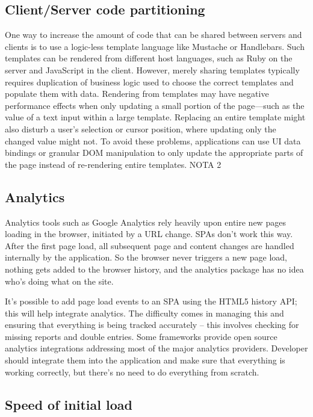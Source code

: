 \subsection{Client/Server code partitioning}
\label{subsec:arc_over_code}
One way to increase the amount of code that can be shared between servers and clients is to use a logic-less template language like Mustache or Handlebars. Such templates can be rendered from different host languages, such as Ruby on the server and JavaScript in the client. However, merely sharing templates typically requires duplication of business logic used to choose the correct templates and populate them with data. Rendering from templates may have negative performance effects when only updating a small portion of the page—such as the value of a text input within a large template. Replacing an entire template might also disturb a user's selection or cursor position, where updating only the changed value might not. To avoid these problems, applications can use UI data bindings or granular DOM manipulation to only update the appropriate parts of the page instead of re-rendering entire templates. NOTA 2

\subsection{Analytics}
\label{subsec:arc_over_analytics}
Analytics tools such as Google Analytics rely heavily upon entire new pages loading in the browser, initiated by a URL change. SPAs don’t work this way.
After the first page load, all subsequent page and content changes are handled internally by the application. So the browser never triggers a new page load, nothing gets added to the browser history, and the analytics package has no idea who’s doing what on the site.

It's possible to add page load events to an SPA using the HTML5 history API; this will help integrate analytics. The difficulty comes in managing this and ensuring that everything is being tracked accurately – this involves checking for missing reports and double entries. Some frameworks provide open source analytics integrations addressing most of the major analytics providers. Developer should integrate them into the application and make sure that everything is working correctly, but there's no need to do everything from scratch.


\subsection{Speed of initial load}
\label{subsec:arc_over_speed}

